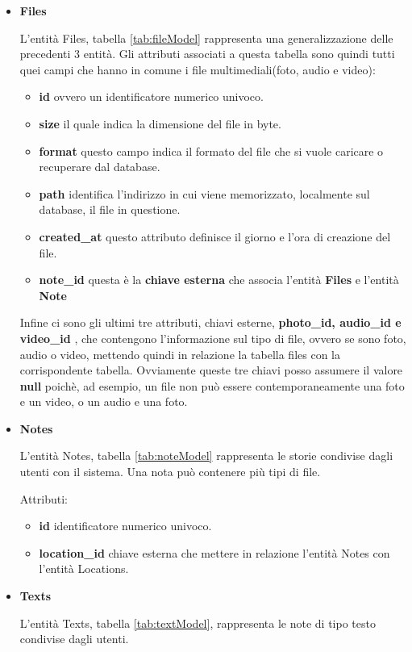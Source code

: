 \begin{itemize}
	\item \textbf{Files}
		
		L'entità Files, tabella \ref{tab:fileModel} rappresenta una generalizzazione delle precedenti 3 entità. Gli attributi associati a questa tabella sono quindi tutti quei campi che hanno in comune i file multimediali(foto, audio e video):
		\begin{itemize}
			\item \textbf{id} ovvero un identificatore numerico univoco.
			\item \textbf{size} il quale indica la dimensione del file in byte.
			\item \textbf{format} questo campo indica il formato del file che si vuole caricare o recuperare dal database.
			\item \textbf{path} identifica l'indirizzo in cui viene memorizzato, localmente sul database, il file in questione.
			\item \textbf{created\_at} questo attributo definisce il giorno e l'ora di creazione del file.
			\item \textbf{note\_id} questa è la \textbf{chiave esterna} che associa l'entità \textbf{Files} e l'entità \textbf{Note}  
		\end{itemize}
	Infine ci sono gli ultimi tre attributi, chiavi esterne, \textbf{photo\_id, audio\_id e video\_id }, che contengono l'informazione sul tipo di file, ovvero se sono foto, audio o video, mettendo quindi in relazione la tabella files con la corrispondente tabella. Ovviamente queste tre chiavi posso assumere il valore \textbf{null} poichè, ad esempio, un file non può essere contemporaneamente una foto e un video, o un audio e una foto. 

	\item \textbf{Notes}
	
		L'entità Notes, tabella \ref{tab:noteModel} rappresenta le storie condivise dagli utenti con il sistema. Una nota può contenere più tipi di file.
		
		Attributi: 
		\begin{itemize}
			\item \textbf{id} identificatore numerico univoco.
			\item \textbf{location\_id} chiave esterna che mettere in relazione l'entità Notes con l'entità Locations.
		\end{itemize}
		
	
	\item \textbf{Texts}
	
		L'entità Texts, tabella \ref{tab:textModel}, rappresenta le note di tipo testo condivise dagli utenti. 
		

\end{itemize}

